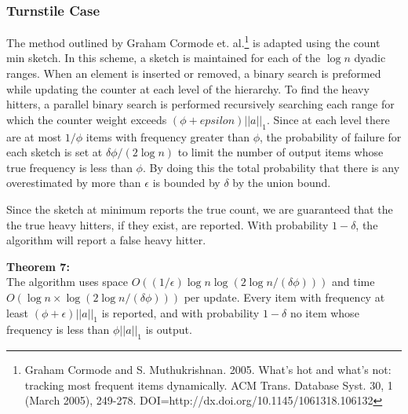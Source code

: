 \documentclass[11pt]{article}
\begin{document}
\subsubsection{Turnstile Case}
The method outlined by Graham Cormode et. al.\footnote{Graham Cormode and S. Muthukrishnan. 2005. What's hot and what's not: tracking most frequent items dynamically. ACM Trans. Database Syst. 30, 1 (March 2005), 249-278. DOI=http://dx.doi.org/10.1145/1061318.106132} is adapted using the count min sketch. In this scheme, a sketch is maintained for each of the $\log n$ dyadic ranges. When an element is inserted or removed, a binary search is preformed while updating the counter at each level of the hierarchy. To find the heavy hitters, a parallel binary search is performed recursively searching each range for which the counter weight exceeds $(\phi + epsilon)||a||_1$. Since at each level there are at most $1/\phi$ items with frequency greater than $\phi$, the probability of failure for each sketch is set at $\delta\phi/(2\log n)$ to limit the number of output items whose true frequency is less than $\phi$. By doing this the total probability that there is any overestimated by more than $\epsilon$ is bounded by $\delta$ by the union bound.

Since the sketch at minimum reports the true count, we are guaranteed that the the true heavy hitters, if they exist, are reported. With probability $1 - \delta$, the algorithm will report a false heavy hitter.

\textbf{Theorem 7:} \\
The algorithm uses space $O((1/\epsilon)\log n \log (2 \log n/(\delta \phi)))$ and time $O(\log n \times \log(2 \log n/(\delta\phi)))$ per update. Every item with frequency at least $(\phi + \epsilon)||a||_1$ is reported, and with probability $1-\delta$ no item whose frequency is less than $\phi ||a||_1$ is output.


\end{document}
